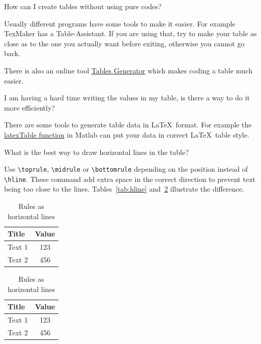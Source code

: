 \begin{QandA}
\item How can I create tables without using pure codes?

	\begin{answered}
		Usually different programs have some tools to make it easier. For example TexMaker has a Table-Assistant. If you are using that, try to make your table as close as to the one you actually want before exiting, otherwise you cannot go back.
		
		There is also an online tool \href{http://www.tablesgenerator.com/}{Tables Generator} which makes coding a table much easier.
	\end{answered}



\item I am having a hard time writing the values in my table, is there a way to do it more efficiently?

	\begin{answered}
		There are some tools to generate table data in \LaTeX\ format. For example the \href{https://github.com/eliduenisch/latexTable}{latexTable function} in Matlab can put your data in correct \LaTeX\ table style.
	\end{answered}
	
	
	
	
\item What is the best way to draw horizontal lines in the table?

	\begin{answered}
		Use \verb|\toprule|, \verb|\midrule| or \verb|\bottomrule| depending on the position instead of \verb|\hline|. These command add extra space in the correct direction to prevent text being too close to the lines. Tables~\ref{tab:hline} and~\ref{tab:rule} illustrate the difference.
		
		\begin{table}
		\parbox{.45\linewidth}{
		\centering
		\caption{Normal horizontal lines}
		\begin{tabular}{lc}
		\hline
		Title & Value\\
		\hline
		Text 1 & 123\\
		Text 2 & 456\\
		\hline
		\end{tabular}
		\label{tab:hline}
		}
		\hfill
		\parbox{.45\linewidth}{
		\centering
		\caption{Rules as horizontal lines}
		\begin{tabular}{lc}
		\toprule
		Title & Value\\
		\midrule
		Text 1 & 123\\
		Text 2 & 456\\
		\bottomrule
		\end{tabular}
		\label{tab:rule}
		}
		\end{table}		
		

\end{answered}
\end{QandA}
